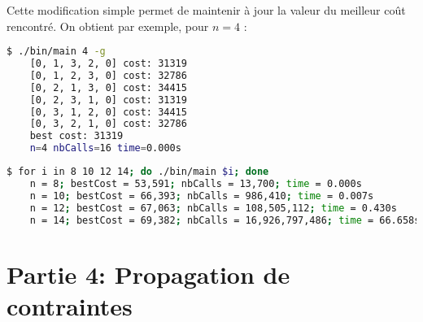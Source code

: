Cette modification simple permet de maintenir à jour la valeur du meilleur coût rencontré. On obtient par exemple, pour $n = 4$ :

\begin{lstlisting}[language=bash, caption={Exécution de l'algorithme \texttt{permut} pour $n = 4$ avec calcul de la longueur et recherche du plus court chemin}]
    $ ./bin/main 4 -g
    [0, 1, 3, 2, 0] cost: 31319
    [0, 1, 2, 3, 0] cost: 32786
    [0, 2, 1, 3, 0] cost: 34415
    [0, 2, 3, 1, 0] cost: 31319
    [0, 3, 1, 2, 0] cost: 34415
    [0, 3, 2, 1, 0] cost: 32786
    best cost: 31319
    n=4 nbCalls=16 time=0.000s
\end{lstlisting}

\begin{lstlisting}[language=bash, caption={Exécution de l'algorithme \texttt{permut} pour différentes valeurs de $n$.}]
    $ for i in 8 10 12 14; do ./bin/main $i; done
    n = 8; bestCost = 53,591; nbCalls = 13,700; time = 0.000s
    n = 10; bestCost = 66,393; nbCalls = 986,410; time = 0.007s
    n = 12; bestCost = 67,063; nbCalls = 108,505,112; time = 0.430s
    n = 14; bestCost = 69,382; nbCalls = 16,926,797,486; time = 66.658s
\end{lstlisting}

\section{Partie 4: Propagation de contraintes}